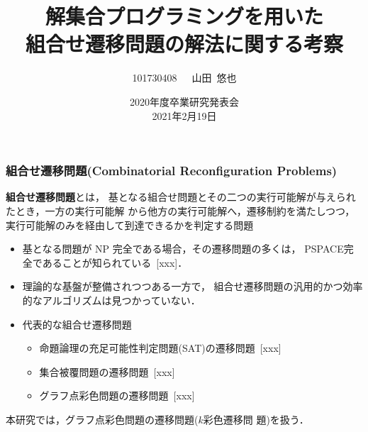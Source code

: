 \documentclass[dvipdfmx,11pt]{beamer}
\title[ASPを用いた組合せ遷移問題の解法に関する考察]{解集合プログラミングを用いた\\組合せ遷移問題の解法に関する考察}
\author{101730408~~~山田~悠也}
\date{2020年度卒業研究発表会\\2021年2月19日}
\institute{番原研究室}
\begin{document}
\begin{frame}\frametitle{}
  \titlepage
\end{frame}

\begin{frame}\frametitle{組合せ遷移問題(Combinatorial Reconfiguration Problems)}

  \begin{alertblock}{}
    \alert{\bf 組合せ遷移問題}とは，
    基となる組合せ問題とその二つの実行可能解が与えられたとき，一方の実行可能解
    から他方の実行可能解へ，遷移制約を満たしつつ，
    実行可能解のみを経由して到達できるかを判定する問題
  \end{alertblock}

  \begin{itemize}
    \item 基となる問題が NP 完全である場合，その遷移問題の多くは，
      \alert{PSPACE完全}であることが知られている~[xxx]．
    \item 理論的な基盤が整備されつつある一方で，
      組合せ遷移問題の\alert{汎用的かつ効率的なアルゴリズムは見つかっていない}．
    \item 代表的な組合せ遷移問題
      \begin{itemize}
      \item 命題論理の充足可能性判定問題(SAT)の遷移問題~[xxx]
      \item 集合被覆問題の遷移問題~[xxx]
      \item グラフ点彩色問題の遷移問題~[xxx] 
      \end{itemize}
  \end{itemize}
  \begin{alertblock}{}\centering
    本研究では，グラフ点彩色問題の遷移問題(\alert{$k$彩色遷移問
      題})を扱う．
  \end{alertblock}

  
\end{frame}
\end{document}

